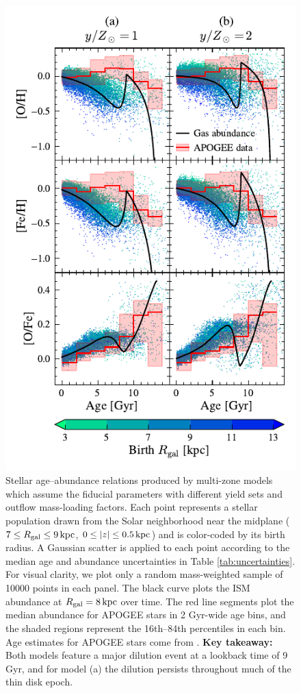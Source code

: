 \documentclass[twocolumn,twocolappendix,linenumbers]{aastex631}
\newcommand{\kpc}{\,{\rm kpc}}
\begin{document}
\begin{figure}
    \centering
    \includegraphics[width=\linewidth]{figures/abundance_evolution_yields.pdf}
    \caption{Stellar age--abundance relations produced by multi-zone models which assume the fiducial parameters with different yield sets and outflow mass-loading factors. Each point represents a stellar population drawn from the Solar neighborhood near the midplane ($7\leq R_{\rm gal}\leq 9\kpc$, $0\leq |z| \leq 0.5\kpc$) and is color-coded by its birth radius. A Gaussian scatter is applied to each point according to the median age and abundance uncertainties in Table \ref{tab:uncertainties}. For visual clarity, we plot only a random mass-weighted sample of \num{10000} points in each panel. The black curve plots the ISM abundance at $R_{\rm gal}=8\kpc$ over time. The red line segments plot the median abundance for APOGEE stars in {2 Gyr}-wide age bins, and the shaded regions represent the 16th--84th percentiles in each bin. Age estimates for APOGEE stars come from \citet{leung_variational_2023}. {\bf Key takeaway:} Both models feature a major dilution event at a lookback time of 9 Gyr, and for model (a) the dilution persists throughout much of the thin disk epoch.}
    \label{fig:abundance-evolution-yields}
\end{figure}
\end{document}
